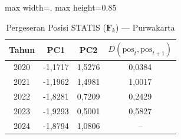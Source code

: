 \begin{table}[H]
\centering
\caption{Pergeseran Posisi STATIS ($\mathbf{F}_k$) --- Purwakarta} \label{tab:app2jarak_statis_skor_purwakarta}
\begin{adjustbox}{max width=\textwidth, max height=0.85\textheight}
\begin{tabular}{|c|c|c|c|}
\hline
\textbf{Tahun} & \textbf{PC1} & \textbf{PC2} & \textbf{$D(\text{pos}_t, \text{pos}_{t+1})$} \\
\hline
2020 & -1,1717 & 1,5276 & 0,0384 \\
2021 & -1,1962 & 1,4981 & 1,0017 \\
2022 & -1,8281 & 0,7209 & 0,2429 \\
2023 & -1,9293 & 0,5001 & 0,5827 \\
2024 & -1,8794 & 1,0806 & -- \\
\hline
\end{tabular}
\end{adjustbox}
\end{table}
